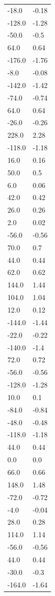 \begin{longtable}{ll}
-18.0 & -0.18 \\
-128.0 & -1.28 \\
-50.0 & -0.5 \\
64.0 & 0.64 \\
-176.0 & -1.76 \\
-8.0 & -0.08 \\
-142.0 & -1.42 \\
-74.0 & -0.74 \\
64.0 & 0.64 \\
-26.0 & -0.26 \\
228.0 & 2.28 \\
-118.0 & -1.18 \\
16.0 & 0.16 \\
50.0 & 0.5 \\
6.0 & 0.06 \\
42.0 & 0.42 \\
26.0 & 0.26 \\
2.0 & 0.02 \\
-56.0 & -0.56 \\
70.0 & 0.7 \\
44.0 & 0.44 \\
62.0 & 0.62 \\
144.0 & 1.44 \\
104.0 & 1.04 \\
12.0 & 0.12 \\
-144.0 & -1.44 \\
-22.0 & -0.22 \\
-140.0 & -1.4 \\
72.0 & 0.72 \\
-56.0 & -0.56 \\
-128.0 & -1.28 \\
10.0 & 0.1 \\
-84.0 & -0.84 \\
-48.0 & -0.48 \\
-118.0 & -1.18 \\
44.0 & 0.44 \\
0.0 & 0.0 \\
66.0 & 0.66 \\
148.0 & 1.48 \\
-72.0 & -0.72 \\
-4.0 & -0.04 \\
28.0 & 0.28 \\
114.0 & 1.14 \\
-56.0 & -0.56 \\
44.0 & 0.44 \\
-30.0 & -0.3 \\
-164.0 & -1.64 \\

\end{longtable}
